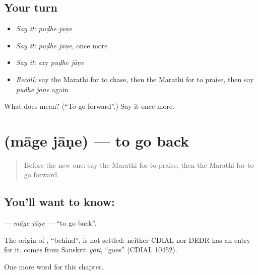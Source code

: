 \subsection*{Your turn}
\begin{itemize}
\raggedright
  \item \emph{Say it:} \emph{puḍhe jāṇe}
  \item \emph{Say it:} \emph{puḍhe jāṇe}, once more
  \item \emph{Say it:} say \emph{puḍhe jāṇe}
  \item \emph{Recall:} say the Marathi for to chase, then the Marathi for to praise, then say \emph{puḍhe jāṇe} again
\end{itemize}

\begin{tcolorbox}[breakable,colback=teal!4,colframe=teal!35!black,title={Before you move on}]
What does   mean? (\textquotedblleft{}To go forward\textquotedblright{}.) Say it once more.
\end{tcolorbox}
\section[\texorpdfstring{\mr{मागे} \mr{जाणे} (māge jāṇe)}{मागे जाणे (māge jāṇe)}]{  (māge jāṇe) — to go back}

\label{lesson:MR-C228-mage-jane}



\begin{quote}
Before the new one: say the Marathi for to praise, then the Marathi for to go forward.
\end{quote}

\subsection*{You'll want to know:  }
\textbf{ } — \emph{māge jāṇe} — \textquotedblleft{}to go back\textquotedblright{}.

\begin{cousinweb}
The origin of \textbf{}, \textquotedblleft{}behind\textquotedblright{}, is not settled: neither CDIAL nor DEDR has an entry for it. \textbf{} comes from Sanskrit \emph{yāti}, \textquotedblleft{}goes\textquotedblright{} (CDIAL 10452).
\end{cousinweb}

\begin{grammarlens}[title={What you've built}]
One more word for this chapter.
\end{grammarlens}

